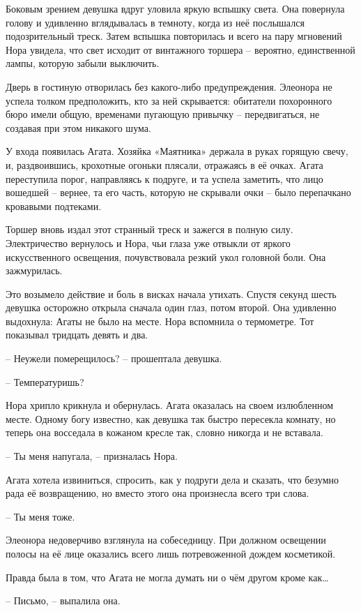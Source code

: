 \documentclass[
  a5paperpaper,
  DIV=11,
  numbers=noendperiod]{scrreprt}
\begin{document}
Боковым зрением девушка вдруг уловила яркую вспышку света. Она повернула
голову и удивленно вглядывалась в темноту, когда из неё послышался
подозрительный треск. Затем вспышка повторилась и всего на пару
мгновений Нора увидела, что свет исходит от винтажного торшера --
вероятно, единственной лампы, которую забыли выключить.

Дверь в гостиную отворилась без какого-либо предупреждения. Элеонора не
успела толком предположить, кто за ней скрывается: обитатели похоронного
бюро имели общую, временами пугающую привычку -- передвигаться, не
создавая при этом никакого шума.

У входа появилась Агата. Хозяйка «Маятника» держала в руках горящую
свечу, и, раздвоившись, крохотные огоньки плясали, отражаясь в её очках.
Агата переступила порог, направляясь к подруге, и та успела заметить,
что лицо вошедшей -- вернее, та его часть, которую не скрывали очки --
было перепачкано кровавыми подтеками.

Торшер вновь издал этот странный треск и зажегся в полную силу.
Электричество вернулось и Нора, чьи глаза уже отвыкли от яркого
искусственного освещения, почувствовала резкий укол головной боли. Она
зажмурилась.

Это возымело действие и боль в висках начала утихать. Спустя секунд
шесть девушка осторожно открыла сначала один глаз, потом второй. Она
удивленно выдохнула: Агаты не было на месте. Нора вспомнила о
термометре. Тот показывал тридцать девять и два.

-- Неужели померещилось? -- прошептала девушка.

-- Температуришь?

Нора хрипло крикнула и обернулась. Агата оказалась на своем излюбленном
месте. Одному богу известно, как девушка так быстро пересекла комнату,
но теперь она восседала в кожаном кресле так, словно никогда и не
вставала.

-- Ты меня напугала, -- призналась Нора.

Агата хотела извиниться, спросить, как у подруги дела и сказать, что
безумно рада её возвращению, но вместо этого она произнесла всего три
слова.

-- Ты меня тоже.

Элеонора недоверчиво взглянула на собеседницу. При должном освещении
полосы на её лице оказались всего лишь потревоженной дождем косметикой.

Правда была в том, что Агата не могла думать ни о чём другом кроме
как\ldots{}

-- Письмо, -- выпалила она.
\end{document}
